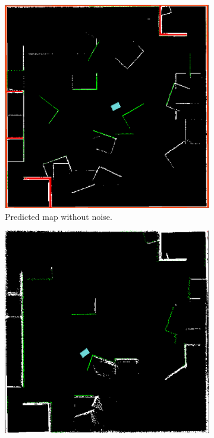 \begin{figure}[htbp]
    \centering
    \begin{subfigure}[t]{0.49\textwidth}
        \includegraphics[width=1.0\textwidth]{chapters/mapping_of_dynamic_areas/figures/fremen_ideal_simulation}	
        \caption{Predicted map without noise.}
        \label{fig:fremen_ideal_sim}
    \end{subfigure}
    \begin{subfigure}[t]{0.49\textwidth}
        \includegraphics[width=1.0\textwidth]{chapters/mapping_of_dynamic_areas/figures/fremen_with_decay_last}

\end{subfigure}
\end{figure}
